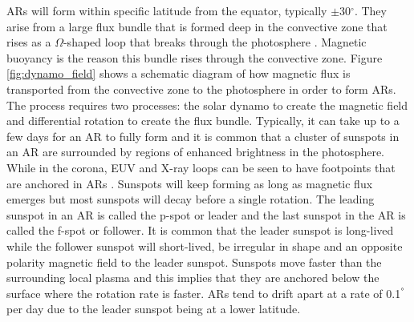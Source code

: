 	ARs will form within specific latitude from the equator, typically $\pm$30$^\circ$.
	They arise from a large flux bundle that is formed deep in the convective zone that rises as a $\Omega$-shaped loop that breaks through the photosphere \citep{SAO,1974MNRAS.169...35M,2014SoPh..289.3351T}.
	Magnetic buoyancy is the reason this bundle rises through the convective zone.
	Figure \ref{fig:dynamo_field} shows a schematic diagram of how magnetic flux is transported from the convective zone to the photosphere in order to form ARs.
	The process requires two processes: the solar dynamo to create the magnetic field and differential rotation to create the flux bundle.
	Typically, it can take up to a few days for an AR to fully form and it is common that a cluster of sunspots in an AR are surrounded by regions of enhanced brightness in the photosphere.
	While in the corona, EUV and X-ray loops can be seen to have footpoints that are anchored in ARs \citep{2014masu.book.....P}.
	Sunspots will keep forming as long as magnetic flux emerges but most sunspots will decay before a single rotation.
	The leading sunspot in an AR is called the p-spot or leader and the last sunspot in the AR is called the f-spot or follower.
	It is common that the leader sunspot is long-lived while the follower sunspot will short-lived, be irregular in shape and an opposite polarity magnetic field to the leader sunspot.
	Sunspots move faster than the surrounding local plasma and this implies that they are anchored below the surface where the rotation rate is faster.
	ARs tend to drift apart at a rate of 0.1$^\degree$ per day due to the leader sunspot being at a lower latitude.
	
